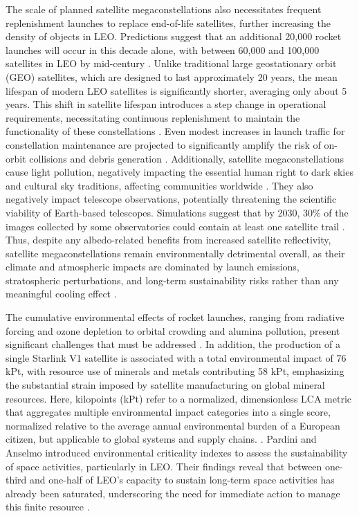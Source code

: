 \documentclass[pdflatex,sn-mathphys-num]{sn-jnl}
\theoremstyle{thmstyleone}%
\theoremstyle{thmstyletwo}%
\theoremstyle{thmstylethree}%
\begin{document}
The scale of planned satellite megaconstellations also necessitates frequent replenishment launches to replace end-of-life satellites, further increasing the density of objects in LEO. Predictions suggest that an additional 20,000 rocket launches will occur in this decade alone, with between 60,000 and 100,000 satellites in LEO by mid-century \citep{gaston_environmental_nodate}. Unlike traditional large geostationary orbit (GEO) satellites, which are designed to last approximately 20 years, the mean lifespan of modern LEO satellites is significantly shorter, averaging only about 5 years. This shift in satellite lifespan introduces a step change in operational requirements, necessitating continuous replenishment to maintain the functionality of these constellations \citep{chou_towards_2022}. Even modest increases in launch traffic for constellation maintenance are projected to significantly amplify the risk of on-orbit collisions and debris generation \citep{somma_sensitivity_2019, zhang_leo_2022}. Additionally, satellite megaconstellations cause light pollution, negatively impacting the essential human right to dark skies and cultural sky traditions, affecting communities worldwide \citep{venkatesan_impact_2020, varela_perez_increasing_2023}. They also negatively impact telescope observations, potentially threatening the scientific viability of Earth-based telescopes. Simulations suggest that by 2030, 30\% of the images collected by some observatories could contain at least one satellite trail \citep{gwynne_observations_2020}. Thus, despite any albedo-related benefits from increased satellite reflectivity, satellite megaconstellations remain environmentally detrimental overall, as their climate and atmospheric impacts are dominated by launch emissions, stratospheric perturbations, and long-term sustainability risks rather than any meaningful cooling effect \citep{boley_satellite_2021}.

The cumulative environmental effects of rocket launches, ranging from radiative forcing and ozone depletion to orbital crowding and alumina pollution, present significant challenges that must be addressed \citep{brown_envisioning_2024}. In addition, the production of a single Starlink V1 satellite is associated with a total environmental impact of 76 kPt, with resource use of minerals and metals contributing 58 kPt, emphasizing the substantial strain imposed by satellite manufacturing on global mineral resources. Here, kilopoints (kPt) refer to a normalized, dimensionless LCA metric that aggregates multiple environmental impact categories into a single score, normalized relative to the average annual environmental burden of a European citizen, but applicable to global systems and supply chains. \citep{kumaran_quantifying_2024}. Pardini and Anselmo introduced environmental criticality indexes to assess the sustainability of space activities, particularly in LEO. Their findings reveal that between one-third and one-half of LEO's capacity to sustain long-term space activities has already been saturated, underscoring the need for immediate action to manage this finite resource \citep{pardini_environmental_2020, pardini_evaluating_2021}.
\end{document}
